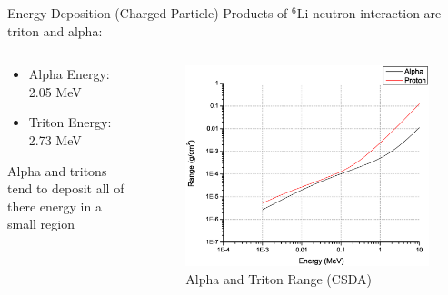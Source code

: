 \begin{frame}{Energy Deposition (Charged Particle)}
Products of ${}^6$Li neutron interaction are triton and alpha:
\begin{columns}[onlytextwidth]
\begin{column}{0.45\textwidth}
\begin{itemize}
	\small
	\item Alpha Energy: 2.05 MeV
	\item Triton Energy: 2.73 MeV
\end{itemize}
Alpha and tritons tend to deposit all of there energy in a small region
\end{column}
\begin{column}{0.45\textwidth}
	\begin{figure}
	\includegraphics[width=\textwidth]{images/PStarAStarRange.eps}
	\caption{Alpha and Triton Range (CSDA) \protect \cite{berger_estar_2005}}
	\label{fig:PStarAStarRange}
	\end{figure}
\end{column}
\end{columns}
\end{frame}

